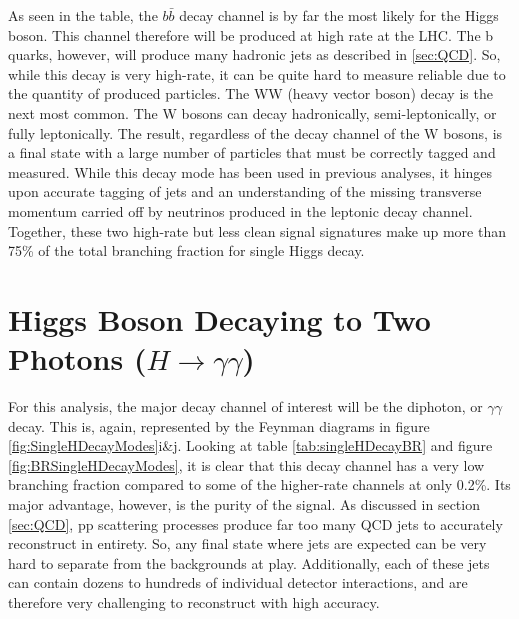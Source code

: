 \documentclass[12pt]{ucsddissertation}
\begin{document}
As seen in the table, the $b\bar{b}$ decay channel is by far the most likely for the Higgs boson. This channel therefore will be produced at high rate at the LHC. The b quarks, however, will produce many hadronic jets as described in \ref{sec:QCD}. So, while this decay is very high-rate, it can be quite hard to measure reliable due to the quantity of produced particles. The WW (heavy vector boson) decay is the next most common. The W bosons can decay hadronically, semi-leptonically, or fully leptonically. The result, regardless of the decay channel of the W bosons, is a final state with a large number of particles that must be correctly tagged and measured. While this decay mode has been used in previous analyses, it hinges upon accurate tagging of jets and an understanding of the missing transverse momentum carried off by neutrinos produced in the leptonic decay channel. Together, these two high-rate but less clean signal signatures make up more than 75\% of the total branching fraction for single Higgs decay.

\section{Higgs Boson Decaying to Two Photons ($H \rightarrow \gamma\gamma$) }\label{sec:HiggsToGammaGamma}
For this analysis, the major decay channel of interest will be the diphoton, or $\gamma \gamma$ decay. This is, again, represented by the Feynman diagrams in figure \ref{fig:SingleHDecayModes}i\&j. Looking at table \ref{tab:singleHDecayBR} and figure \ref{fig:BRSingleHDecayModes}, it is clear that this decay channel has a very low branching fraction compared to some of the higher-rate channels at only 0.2\%. Its major advantage, however, is the purity of the signal. As discussed in section \ref{sec:QCD}, pp scattering processes produce far too many QCD jets to accurately reconstruct in entirety. So, any final state where jets are expected can be very hard to separate from the backgrounds at play. Additionally, each of these jets can contain dozens to hundreds of individual detector interactions, and are therefore very challenging to reconstruct with high accuracy.
\end{document}

